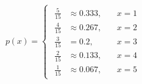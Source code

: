 \documentclass[12pt]{article}
\begin{document}
\begin{enumerate}[label={},leftmargin=0in]
			\[\boxed{p(x) =
				\begin{cases}
					\begin{aligned}
						\frac{5}{15} &\approx 0.333,&\quad x = 1\\
						\frac{4}{15} &\approx 0.267,&\quad x = 2\\
						\frac{3}{15} &= 0.2,&\quad x = 3\\
						\frac{2}{15} &\approx 0.133,&\quad x = 4\\
						\frac{1}{15} &\approx 0.067,&\quad x = 5
					\end{aligned}
			\end{cases}}\]
	\end{enumerate}
	
\end{document}
